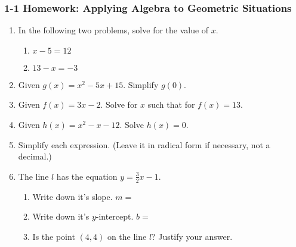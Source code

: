 \documentclass[12pt, twoside]{article}
\begin{document}
\subsubsection*{1-1 Homework: Applying Algebra to Geometric Situations}
  \begin{enumerate}


  \item In the following two problems, solve for the value of $x$.
  \begin{multicols}{2}
    \begin{enumerate}
      \item   $x-5=12$ \vspace{6cm}
      \item   $13-x=-3$ \vspace{6cm}
    \end{enumerate}
  \end{multicols}
    \vspace{3cm}

  \item Given $g(x)=x^2-5x+15$. Simplify $g(0)$. \vspace{3cm}
  \item Given $f(x)=3x-2$. Solve for $x$ such that for $f(x)=13$. \vspace{4cm}
  \item Given $h(x)=x^2-x-12$. Solve $h(x)=0$. \vspace{5cm}
  

  \item Simplify each expression. (Leave it in radical form if necessary, not a decimal.)
    \begin{enumerate}
    \end{enumerate}
    \vspace{0.5cm}

\newpage

\item The line $l$ has the equation $y=\frac{3}{2}x-1$. 
\begin{enumerate}
  \item Write down it's slope. $m=$
  \vspace{0.5cm}
  \item Write down it's $y$-intercept. $b=$
  \vspace{0.5cm}
  \item Is the point $(4, 4)$ on the line $l$? Justify your answer.
\end{enumerate}
\vspace{2.5cm}


\end{enumerate}
\end{document}
